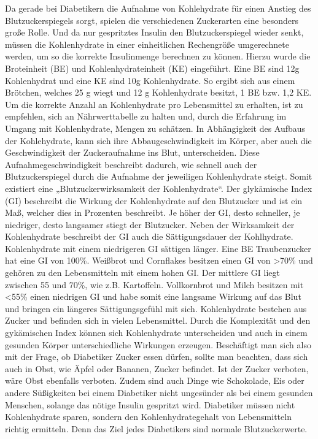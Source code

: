 \documentclass[a4paper,11pt]{article}%
\renewcommand{\\}{\vspace*{0.5\baselineskip} \newline}
\begin{document}
		Da gerade bei Diabetikern die Aufnahme von Kohlehydrate für einen Anstieg des Blutzuckerspiegels sorgt, spielen die verschiedenen Zuckerarten eine besonders große Rolle. Und da nur gespritztes Insulin den Blutzuckerspiegel wieder senkt, müssen die Kohlenhydrate in einer einheitlichen Rechengröße umgerechnete werden, um so die korrekte Insulinmenge berechnen zu können. Hierzu wurde die Broteinheit (BE) und Kohlenhydrateinheit (KE) eingeführt. Eine BE sind 12g Kohlenhydrat und eine KE sind 10g Kohlenhydrate. So ergibt sich aus einem Brötchen, welches 25 g wiegt und 12 g Kohlenhydrate besitzt, 1 BE bzw. 1,2 KE. Um die korrekte Anzahl an Kohlenhydrate pro Lebensmittel zu erhalten, ist zu empfehlen, sich an Nährwerttabelle zu halten und, durch die Erfahrung im Umgang mit Kohlenhydrate, Mengen zu schätzen.\newline
		In Abhängigkeit des Aufbaus der Kohlehydrate, kann sich ihre Abbaugeschwindigkeit im Körper, aber auch die Geschwindigkeit der Zuckeraufnahme ins Blut, unterscheiden. Diese Aufnahmegeschwindigkeit beschreibt dadurch, wie schnell auch der Blutzuckerspiegel durch die Aufnahme der jeweiligen Kohlenhydrate steigt. Somit existiert eine „Blutzuckerwirksamkeit der Kohlenhydrate“. Der glykämische Index (GI) beschreibt die Wirkung der Kohlenhydrate auf den Blutzucker und ist ein Maß, welcher dies in Prozenten beschreibt. Je höher der GI, desto schneller, je niedriger, desto langsamer stiegt der Blutzucker. Neben der Wirksamkeit der Kohlenhydrate beschreibt der GI auch die Sättigungsdauer der Kohlhydrate. Kohlenhydrate mit einem niedrigeren GI sättigen länger. \newline
		Eine BE Traubenzucker hat eine GI von 100\%. Weißbrot und Cornflakes besitzen einen GI von >70\% und gehören zu den Lebensmitteln mit einem hohen GI. Der mittlere GI liegt zwischen 55 und 70\%, wie z.B. Kartoffeln. Vollkornbrot und Milch besitzen mit <55\% einen niedrigen GI und habe somit eine langsame Wirkung auf das Blut und bringen ein längeres Sättigungsgefühl mit sich.\cite{SG}\\
		Kohlenhydrate bestehen aus Zucker und befinden sich in vielen Lebensmittel. Durch die Komplexität und den gykämischen Index können sich Kohlenhydrate unterscheiden und auch in einem gesunden Körper unterschiedliche Wirkungen erzeugen. Beschäftigt man sich also mit der Frage, ob Diabetiker Zucker essen dürfen, sollte man beachten, dass sich auch in Obst, wie Äpfel oder Bananen, Zucker befindet. Ist der Zucker verboten, wäre Obst ebenfalls verboten. Zudem sind auch Dinge wie Schokolade, Eis oder andere Süßigkeiten bei einem Diabetiker nicht ungesünder als bei einem gesunden Menschen, solange das nötige Insulin gespritzt wird. Diabetiker müssen nicht Kohlenhydrate sparen, sondern den Kohlenhydrategehalt von Lebensmitteln richtig ermitteln. Denn das Ziel jedes Diabetikers sind normale Blutzuckerwerte.\cite{SG}		
\end{document}
